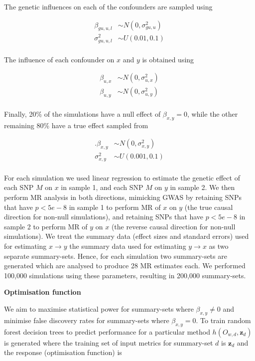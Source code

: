 \documentclass[]{article}
\begin{document}
The genetic influences on each of the confounders are sampled using

\[
\begin{aligned}
\beta_{gu,u,l} & \sim N(0, \sigma^2_{gu,u}) \\
\sigma^2_{gu,u,l} & \sim U(0.01, 0.1) \\
\end{aligned}
\]

The influence of each confounder on \(x\) and \(y\) is obtained using

\[
\begin{aligned}
\beta_{u,x} & \sim N(0, \sigma^{2}_{u,x}) \\
\beta_{u,y} & \sim N(0, \sigma^{2}_{u,y}) \\
\end{aligned}
\]

Finally, 20\% of the simulations have a null effect of
\(\beta_{x,y} = 0\), while the other remaining 80\% have a true effect
sampled from

\[
\begin{aligned}.
\beta_{x,y} & \sim N(0, \sigma^2_{x,y}) \\
\sigma^2_{x,y} & \sim U(0.001, 0.1) \\
\end{aligned}
\]

For each simulation we used linear regression to estimate the genetic
effect of each SNP \(M\) on \(x\) in sample 1, and each SNP \(M\) on
\(y\) in sample 2. We then perform MR analysis in both directions,
mimicking GWAS by retaining SNPs that have \(p < 5e-8\) in sample 1 to
perform MR of \(x\) on \(y\) (the true causal direction for non-null
simulations), and retaining SNPs that have \(p < 5e-8\) in sample 2 to
perform MR of \(y\) on \(x\) (the reverse causal direction for non-null
simulations). We treat the summary data (effect sizes and standard
errors) used for estimating \(x \rightarrow y\) the summary data used
for estimating \(y \rightarrow x\) as two separate summary-sets. Hence,
for each simulation two summary-sets are generated which are analysed to
produce 28 MR estimates each. We performed 100,000 simulations using
these parameters, resulting in 200,000 summary-sets.

\textbf{Optimisation function}

We aim to maximise statistical power for summary-sets where
\(\beta_{x,y} \neq 0\) and minimise false discovery rates for
summary-sets where \(\beta_{x,y} = 0\). To train random forest decision
trees to predict performance for a particular method
\(h(O_{w,d}, \textbf{z}_{d})\) is generated where the training set of
input metrics for summary-set \(d\) is \(\textbf{z}_{d}\) and the
response (optimisation function) is
\end{document}
